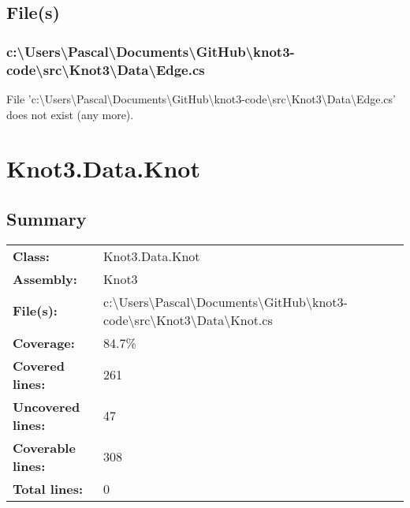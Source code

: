 \documentclass[a4paper,10pt]{article}
\begin{document}
\subsection{File(s)}
\subsubsection{c:\textbackslash Users\textbackslash Pascal\textbackslash Documents\textbackslash GitHub\textbackslash knot3-code\textbackslash src\textbackslash Knot3\textbackslash Data\textbackslash Edge.cs}
 File 'c:\textbackslash Users\textbackslash Pascal\textbackslash Documents\textbackslash GitHub\textbackslash knot3-code\textbackslash src\textbackslash Knot3\textbackslash Data\textbackslash Edge.cs' does not exist (any more).
\newpage
\section{Knot3.Data.Knot}
\subsection{Summary}
\begin{longtable}[l]{ll}
\textbf{Class:} & Knot3.Data.Knot\\
\textbf{Assembly:} & Knot3\\
\textbf{File(s):} & \begin{minipage}[t]{12cm}{c:\textbackslash Users\textbackslash Pascal\textbackslash Documents\textbackslash GitHub\textbackslash knot3-code\textbackslash src\textbackslash Knot3\textbackslash Data\textbackslash Knot.cs}\end{minipage} \\
\textbf{Coverage:} & 84.7\%\\
\textbf{Covered lines:} & 261\\
\textbf{Uncovered lines:} & 47\\
\textbf{Coverable lines:} & 308\\
\textbf{Total lines:} & 0\\
\end{longtable}
\end{document}
